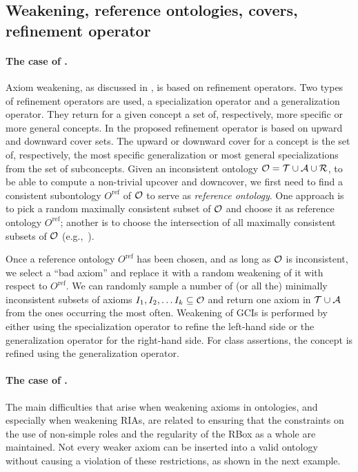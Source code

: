 \documentclass[
]{ceurart}
\begin{document}
\subsection{Weakening, reference ontologies, covers, refinement operator}

\paragraph{The case of \ALC.}
Axiom weakening, as discussed in \cite{troquard2018repairing}, is based on refinement operators. Two types of refinement operators are used, a specialization operator and a generalization operator. They return for a given concept a set of, respectively, more specific or more general concepts. In \cite{troquard2018repairing} the proposed refinement operator is based on upward and downward cover sets. The upward or downward cover for a concept is the set of, respectively, the most specific generalization or most general specializations from the set of subconcepts.
%
Given an inconsistent ontology $\mathcal{O} = \mathcal{T} \cup \mathcal{A} \cup \mathcal{R}$, to be able to compute a non-trivial upcover and downcover, we first need to find a consistent subontology $O^\text{ref}$ of $\mathcal{O}$ to serve as \emph{reference ontology}. One approach is to pick a random maximally consistent subset of $\mathcal{O}$ and choose it as reference ontology $O^\text{ref}$; another is to choose the intersection of all maximally consistent subsets of $\mathcal{O}$ (e.g.,~\cite{LLRRS10}).

Once a reference ontology $O^\text{ref}$ has been chosen, and as long as $\mathcal{O}$ is inconsistent, we select a ``bad axiom'' and replace it with a random weakening of it with respect to $O^\text{ref}$.
%
We can randomly sample a number of (or all the) minimally inconsistent subsets of axioms $I_1, I_2, \ldots I_k \subseteq \mathcal{O}$ and return one axiom in $\mathcal{T} \cup \mathcal{A}$ from the ones occurring the most often.
%
Weakening of GCIs is performed by either using the specialization operator to refine the left-hand side or the generalization operator for the right-hand side. For class assertions, the concept is refined using the generalization operator.

\paragraph{The case of \SROIQ.}
The main difficulties that arise when weakening axioms in \SROIQ ontologies, and especially when weakening RIAs, are related to ensuring that the constraints on the use of non-simple roles and the regularity of the RBox as a whole are maintained. Not every weaker axiom can be inserted into a valid \SROIQ ontology without causing a violation of these restrictions, as shown in the next example.
\end{document}
